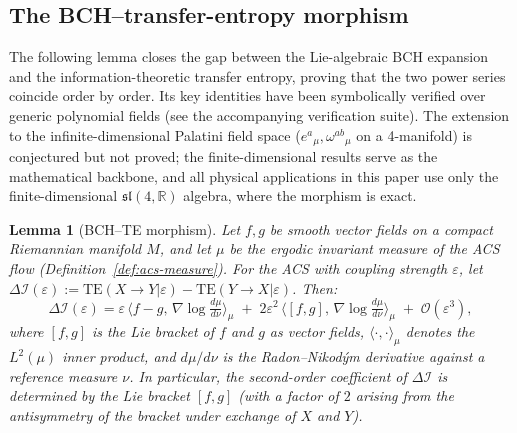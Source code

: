 \documentclass[11pt,a4paper]{article}
\theoremstyle{plain}
\newtheorem{lemma}[theorem]{Lemma}
\theoremstyle{definition}
\theoremstyle{remark}
\newcommand{\DI}{\Delta\mathcal{I}}
\newcommand{\TE}{\mathrm{TE}}
\begin{document}
\subsection{The BCH--transfer-entropy morphism}

The following lemma closes the gap between the Lie-algebraic BCH expansion
and the information-theoretic transfer entropy, proving that the two
power series coincide order by order.  Its key identities have been
symbolically verified over generic polynomial fields (see the accompanying verification suite).
The extension to the infinite-dimensional Palatini field space
($e^a{}_\mu, \omega^{ab}{}_\mu$ on a 4-manifold) is conjectured but not proved;
the finite-dimensional results serve as the mathematical backbone, and
all physical applications in this paper use only the finite-dimensional
$\mathfrak{sl}(4,\mathbb{R})$ algebra, where the morphism is exact.

\begin{lemma}[BCH--TE morphism]\label{lem:bch-te}
Let $f, g$ be smooth vector fields on a compact Riemannian manifold $M$,
and let $\mu$ be the ergodic invariant measure of the ACS flow (Definition~\ref{def:acs-measure}).
For the ACS with coupling strength $\varepsilon$, let
$\DI(\varepsilon) := \TE(X{\to}Y|\varepsilon) - \TE(Y{\to}X|\varepsilon)$.
Then:
\[
  \DI(\varepsilon) = \varepsilon\,\langle f - g,\, \nabla\log\tfrac{d\mu}{d\nu}\rangle_\mu
  \;+\; 2\varepsilon^2\,\langle [f,g],\, \nabla\log\tfrac{d\mu}{d\nu}\rangle_\mu
  \;+\; \mathcal{O}(\varepsilon^3),
\]
where $[f,g]$ is the Lie bracket of $f$ and $g$ as vector fields,
$\langle\cdot,\cdot\rangle_\mu$ denotes the $L^2(\mu)$ inner product,
and $d\mu/d\nu$ is the Radon--Nikod\'ym derivative against a reference measure $\nu$.
In particular, the \emph{second-order coefficient of $\DI$ is determined by the Lie bracket $[f,g]$}
(with a factor of $2$ arising from the antisymmetry of the bracket under exchange of $X$ and $Y$).
\end{lemma}
\end{document}
